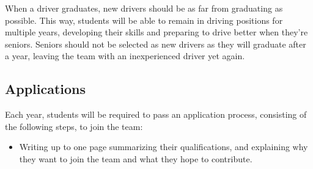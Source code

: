 \documentclass{proc}
\begin{document}
When a driver graduates, new drivers should be as far from graduating as possible. This way, students will be able to remain in driving positions for multiple years, developing their skills and preparing to drive better when they're seniors. Seniors should not be selected as new drivers as they will graduate after a year, leaving the team with an inexperienced driver yet again.

\subsection{Applications}
Each year, students will be required to pass an application process, consisting of the following steps, to join the team:
\begin{itemize}
  \item{Writing up to one page summarizing their qualifications, and explaining why they want to join the team and what they hope to contribute.}
\end{itemize}
\end{document}
